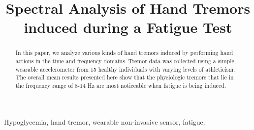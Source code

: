 \documentclass[conference, a4paper]{IEEEtran}
\begin{document}
%
\title{Spectral Analysis of Hand Tremors induced during a Fatigue Test}
%
\author{
}
\maketitle
\begin{abstract}
  In this paper, we analyze various kinds of hand tremors induced by performing hand actions in the time and frequency domains. Tremor data was collected using a simple, wearable accelerometer from 15 healthy individuals with varying levels of athleticism. The overall mean results presented here show that the physiologic tremors that lie in the frequency range of 8-14 Hz are most noticeable when fatigue is being induced.
\end{abstract}
\begin{IEEEkeywords}
  Hypoglycemia, hand tremor, wearable non-invasive sensor, fatigue.
\end{IEEEkeywords}
\IEEEpeerreviewmaketitle
\end{document}
